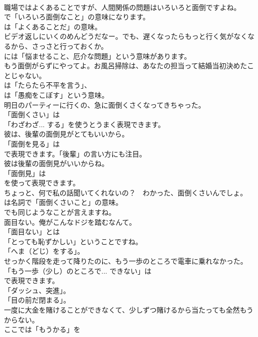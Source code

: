 \documentclass[8pt]{extreport}
\begin{document}
\begin{CJK}{UTF8}{min}
\\	職場ではよくあることですが、人間関係の問題はいろいろと面倒ですよね。 
\\	で「いろいろ面倒なこと」の意味になります。
\\	は「よくあることだ」の意味。	
\\	ビデオ返しにいくのめんどうだなー。でも、遅くなったらもっと行く気がなくなるから、さっさと行っておくか。 
\\	には「悩ませること、厄介な問題」という意味があります。	
\\	もう面倒がらずにやってよ。お風呂掃除は、あなたの担当って結婚当初決めたことじゃない。 
\\	は「たらたら不平を言う」、
\\	は「愚痴をこぼす」という意味。	
\\	明日のパーティーに行くの、急に面倒くさくなってきちゃった。 
\\	「面倒くさい」は
\\	「わざわざ... する」を使うとうまく表現できます。	
\\	彼は、後輩の面倒見がとてもいいから。 
\\	「面倒を見る」は
\\	で表現できます。「後輩」の言い方にも注目。	
\\	彼は後輩の面倒見がいいからね。 
\\	「面倒見」は
\\	を使って表現できます。	
\\	ちょっと、何で私の話聞いてくれないの？　わかった、面倒くさいんでしょ。 
\\	は名詞で「面倒くさいこと」の意味。
\\	でも同じようなことが言えますね。	
\\	面目ない。俺がこんなドジを踏むなんて。 
\\	「面目ない」とは
\\	「とっても恥ずかしい」ということですね。
\\	「へま（どじ）をする」。	
\\	せっかく階段を走って降りたのに、もう一歩のところで電車に乗れなかった。 
\\	「もう一歩（少し）のところで... できない」は
\\	で表現できます。
\\	「ダッシュ、突進」。
\\	「目の前だ閉まる」。	
\\	一度に大金を賭けることができなくて、少しずつ賭けるから当たっても全然もうからない。 
\\	ここでは「もうかる」を

\end{CJK}
\end{document}
